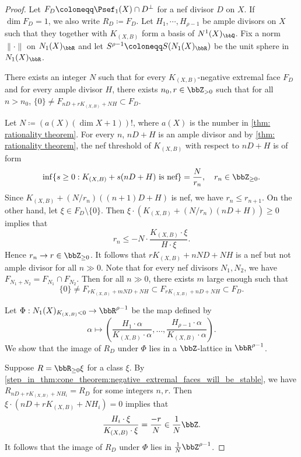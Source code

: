     \begin{proof}
        Let \(F_D \coloneqq \Psef_1(X) \cap D^\perp\) for a nef divisor \(D\) on \(X\).
        If \(\dim F_D = 1\), we also write \(R_D \coloneqq F_D\).
        Let \(H_1,\cdots,H_{\rho-1}\) be ample divisors on \(X\) such that they together with \(K_{(X,B)}\) form a basis of \(N^1(X)_\bbQ\).
        Fix a norm \(\|\cdot\|\) on \(N_1(X)_\bbR\) and let \(S^{\rho-1} \coloneqq S(N_1(X)_\bbR)\) be the unit sphere in \(N_1(X)_\bbR\).
        
        \begin{step}\label{step_in_thm:cone_theorem:negative_extremal_faces_will_be_stable}
            There exists an integer \(N\) such that for every \(K_{(X,B)}\)-negative extremal face \(F_D\) and for every ample divisor \(H\), 
            there exists \(n_0, r \in \bbZ_{>0}\) such that for all \(n>n_0\), \(\{0\} \neq F_{nD+rK_{(X,B)}+N H} \subset F_D\). 
        \end{step}
        Let \(N \coloneqq (a(X)(\dim X + 1))!\), where \(a(X)\) is the number in \cref{thm: rationality theorem}.
        For every \(n\), \(nD+H\) is an ample divisor and by \cref{thm: rationality theorem}, the nef threshold of \(K_{(X,B)}\) with respect to \(nD+H\) is of form
        \[ \inf \{s \geq 0: K_{(X,B)} + s(nD+H) \text{ is nef}\} = \frac{N}{r_n}, \quad r_n \in \bbZ_{\geq 0}. \]
        Since \(K_{(X,B)} + (N/r_n)((n+1)D+H)\) is nef, we have \(r_{n} \leq r_{n+1}\).
        On the other hand, let \(\xi \in F_{D}\setminus \{0\}\). 
        Then \(\xi \cdot (K_{(X,B)} + (N/r_n)(nD+H)) \geq 0\) implies that
        \[ r_n \leq - N \cdot \frac{K_{(X,B)}\cdot \xi}{H \cdot \xi}. \]
        Hence \(r_n \to r \in \bbZ_{\geq 0}\).
        It follows that \(rK_{(X,B)}+nND+NH\) is a nef but not ample divisor for all \(n \gg 0\).
        Note that for every nef divisors \(N_1,N_2\), we have \(F_{N_1+N_2} = F_{N_1} \cap F_{N_2}\).
        Then for all \(n \gg 0\), there exists \(m\) large enough such that
        \[ \{0\} \neq F_{rK_{(X,B)}+mND+N H} \subset F_{rK_{(X,B)}+nD+NH} \subset F_D. \]

        \begin{step}\label{step_in_thm:cone_theorem:nagetive_extremal_rays_form_a_lattice}
            Let \(\Phi: N_1(X)_{K_{(X,B)}<0} \to \bbR^{\rho-1}\) be the map defined by 
            \[ \alpha \mapsto \left( \frac{H_1 \cdot \alpha}{K_{(X,B)}\cdot \alpha},\ldots, \frac{H_{\rho-1} \cdot \alpha}{K_{(X,B)}\cdot \alpha}\right). \]
            We show that the image of \(R_D\) under \(\Phi\) lies in a \(\bbZ\)-lattice in \(\bbR^{\rho-1}\).
        \end{step}
        Suppose \(R = \bbR_{\geq 0}\xi\) for a class \(\xi\).
        By \cref{step_in_thm:cone_theorem:negative_extremal_faces_will_be_stable}, we have \(R_{nD+rK_{(X,B)}+N H_i} = R_{D}\) for some integers \(n,r\).
        Then \( \xi \cdot (nD+rK_{(X,B)}+N H_i) = 0 \) implies that
        \[ \frac{H_i \cdot \xi}{K_{(X,B)}\cdot \xi} = \frac{-r}{N} \in \frac{1}{N}\bbZ. \]
        It follows that the image of \(R_D\) under \(\Phi\) lies in \(\frac{1}{N} \bbZ^{\rho-1}\).


\end{proof}
